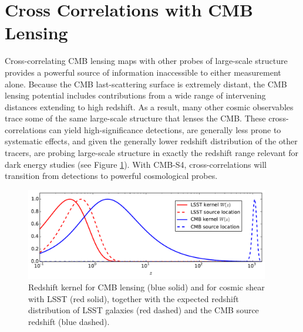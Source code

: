 \documentclass{tcibook}
\begin{document}
\section{Cross Correlations with CMB Lensing}\label{cross}

Cross-correlating CMB lensing maps with other probes of large-scale structure provides a powerful source of information inaccessible to either measurement alone. Because the CMB last-scattering surface is extremely distant, the CMB lensing potential includes contributions from a wide range of 
intervening distances extending to high redshift. As a result, many other cosmic observables trace some of the same large-scale structure that lenses the CMB. These cross-correlations can yield high-significance detections, are generally less prone to systematic effects, and given the generally lower redshift distribution of the other tracers, are probing large-scale structure in exactly the redshift range relevant for dark energy studies (see Figure \ref{cmb-gal-kernels}). 
With CMB-S4, cross-correlations will transition from detections to powerful cosmological probes. 

\begin{figure}[h]
\centering
\includegraphics[width=0.95\textwidth]{CMB_effs.pdf}
\caption{Redshift kernel for CMB lensing (blue solid) and for cosmic shear with LSST (red solid), together with the expected redshift distribution of LSST galaxies (red dashed) and the CMB source redshift (blue dashed).}
\label{cmb-gal-kernels}
\end{figure}
\end{document}
